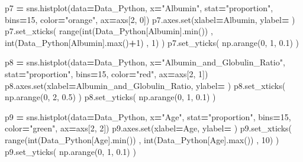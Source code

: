 \documentclass[
  11pt,
  a4paper,
]{article}
\newenvironment{Shaded}{\begin{snugshade}}{\end{snugshade}}
\newcommand{\BuiltInTok}[1]{#1}
\newcommand{\DecValTok}[1]{\textcolor[rgb]{0.00,0.00,0.81}{#1}}
\newcommand{\FloatTok}[1]{\textcolor[rgb]{0.00,0.00,0.81}{#1}}
\newcommand{\NormalTok}[1]{#1}
\newcommand{\OperatorTok}[1]{\textcolor[rgb]{0.81,0.36,0.00}{\textbf{#1}}}
\newcommand{\StringTok}[1]{\textcolor[rgb]{0.31,0.60,0.02}{#1}}
\begin{document}
\begin{Shaded}
\begin{Highlighting}[]
\NormalTok{p7 }\OperatorTok{=}\NormalTok{ sns.histplot(data}\OperatorTok{=}\NormalTok{Data\_Python, x}\OperatorTok{=}\StringTok{"Albumin"}\NormalTok{, stat}\OperatorTok{=}\StringTok{"proportion"}\NormalTok{, bins}\OperatorTok{=}\DecValTok{15}\NormalTok{, color}\OperatorTok{=}\StringTok{"orange"}\NormalTok{, ax}\OperatorTok{=}\NormalTok{axs[}\DecValTok{2}\NormalTok{, }\DecValTok{0}\NormalTok{])}
\NormalTok{p7.axes.}\BuiltInTok{set}\NormalTok{(xlabel}\OperatorTok{=}\StringTok{\textquotesingle{}Albumin\textquotesingle{}}\NormalTok{, ylabel}\OperatorTok{=}\StringTok{\textquotesingle{} \textquotesingle{}}\NormalTok{)}
\NormalTok{p7.set\_xticks( }\BuiltInTok{range}\NormalTok{(}\BuiltInTok{int}\NormalTok{(Data\_Python[}\StringTok{\textquotesingle{}Albumin\textquotesingle{}}\NormalTok{].}\BuiltInTok{min}\NormalTok{()) , }\BuiltInTok{int}\NormalTok{(Data\_Python[}\StringTok{\textquotesingle{}Albumin\textquotesingle{}}\NormalTok{].}\BuiltInTok{max}\NormalTok{()}\OperatorTok{+}\DecValTok{1}\NormalTok{) , }\DecValTok{1}\NormalTok{) )}
\NormalTok{p7.set\_yticks( np.arange(}\DecValTok{0}\NormalTok{, }\DecValTok{1}\NormalTok{, }\FloatTok{0.1}\NormalTok{)  )}

\NormalTok{p8 }\OperatorTok{=}\NormalTok{ sns.histplot(data}\OperatorTok{=}\NormalTok{Data\_Python, x}\OperatorTok{=}\StringTok{"Albumin\_and\_Globulin\_Ratio"}\NormalTok{, stat}\OperatorTok{=}\StringTok{"proportion"}\NormalTok{, bins}\OperatorTok{=}\DecValTok{15}\NormalTok{, color}\OperatorTok{=}\StringTok{"red"}\NormalTok{, ax}\OperatorTok{=}\NormalTok{axs[}\DecValTok{2}\NormalTok{, }\DecValTok{1}\NormalTok{])}
\NormalTok{p8.axes.}\BuiltInTok{set}\NormalTok{(xlabel}\OperatorTok{=}\StringTok{\textquotesingle{}Albumin\_and\_Globulin\_Ratio\textquotesingle{}}\NormalTok{, ylabel}\OperatorTok{=}\StringTok{\textquotesingle{} \textquotesingle{}}\NormalTok{)}
\NormalTok{p8.set\_xticks( np.arange(}\DecValTok{0}\NormalTok{, }\DecValTok{2}\NormalTok{, }\FloatTok{0.5}\NormalTok{)  )}
\NormalTok{p8.set\_yticks( np.arange(}\DecValTok{0}\NormalTok{, }\DecValTok{1}\NormalTok{, }\FloatTok{0.1}\NormalTok{)  )}

\NormalTok{p9 }\OperatorTok{=}\NormalTok{ sns.histplot(data}\OperatorTok{=}\NormalTok{Data\_Python, x}\OperatorTok{=}\StringTok{"Age"}\NormalTok{, stat}\OperatorTok{=}\StringTok{"proportion"}\NormalTok{, bins}\OperatorTok{=}\DecValTok{15}\NormalTok{, color}\OperatorTok{=}\StringTok{"green"}\NormalTok{, ax}\OperatorTok{=}\NormalTok{axs[}\DecValTok{2}\NormalTok{, }\DecValTok{2}\NormalTok{])}
\NormalTok{p9.axes.}\BuiltInTok{set}\NormalTok{(xlabel}\OperatorTok{=}\StringTok{\textquotesingle{}Age\textquotesingle{}}\NormalTok{, ylabel}\OperatorTok{=}\StringTok{\textquotesingle{} \textquotesingle{}}\NormalTok{)}
\NormalTok{p9.set\_xticks( }\BuiltInTok{range}\NormalTok{(}\BuiltInTok{int}\NormalTok{(Data\_Python[}\StringTok{\textquotesingle{}Age\textquotesingle{}}\NormalTok{].}\BuiltInTok{min}\NormalTok{()) , }\BuiltInTok{int}\NormalTok{(Data\_Python[}\StringTok{\textquotesingle{}Age\textquotesingle{}}\NormalTok{].}\BuiltInTok{max}\NormalTok{()) , }\DecValTok{10}\NormalTok{) )}
\NormalTok{p9.set\_yticks( np.arange(}\DecValTok{0}\NormalTok{, }\DecValTok{1}\NormalTok{, }\FloatTok{0.1}\NormalTok{)  )}


\end{Highlighting}
\end{Shaded}
\end{document}
